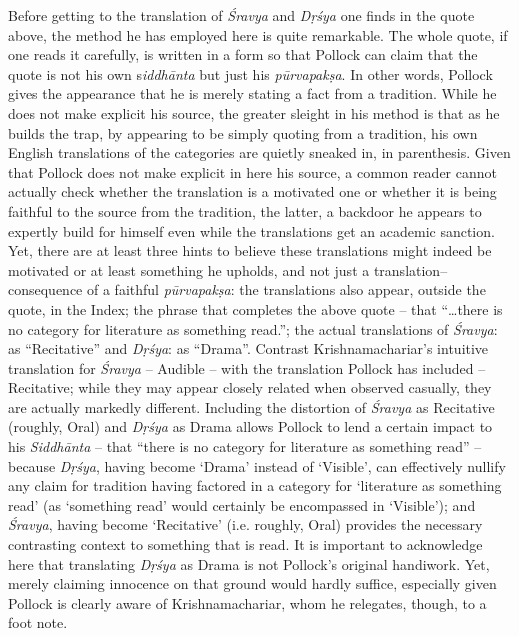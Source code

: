 Before getting to the translation of \textit{Śravya} and \textit{Dṛśya} one finds in the quote above, the method he has employed here is quite remarkable. The whole quote, if one reads it carefully, is written in a form so that Pollock can claim that the quote is not his own s\textit{iddhānta} but just his \textit{pūrvapakṣa}. In other words, Pollock gives the appearance that he is merely stating a fact from a tradition. While he does not make explicit his source, the greater sleight in his method is that as he builds the trap, by appearing to be simply quoting from a tradition, his own English translations of the categories are quietly sneaked in, in parenthesis. Given that Pollock does not make explicit in here his source, a common reader cannot actually check whether the translation is a motivated one or whether it is being faithful to the source from the tradition, the latter, a backdoor he appears to expertly build for himself even while the translations get an academic sanction. Yet, there are at least three hints to believe these translations might indeed be motivated or at least something he upholds, and not just a translation–consequence of a faithful \textit{pūrvapakṣa}: the translations also appear, outside the quote, in the Index; the phrase that completes the above quote – that “…there is no category for literature as something read.”; the actual translations of \textit{Śravya}: as “Recitative” and \textit{Dṛśya}: as “Drama”. Contrast Krishnamachariar’s intuitive translation for \textit{Śravya} – Audible – with the translation Pollock has included – Recitative; while they may appear closely related when observed casually, they are actually markedly different. Including the distortion of \textit{Śravya} as Recitative (roughly, Oral) and \textit{Dṛśya} as Drama allows Pollock to lend a certain impact to his \textit{Siddhānta} – that “there is no category for literature as something read” – because \textit{Dṛśya}, having become ‘Drama’ instead of ‘Visible’, can effectively nullify any claim for tradition having factored in a category for ‘literature as something read’ (as ‘something read’ would certainly be encompassed in ‘Visible’); and \textit{Śravya}, having become ‘Recitative’ (i.e. roughly, Oral) provides the necessary contrasting context to something that is read. It is important to acknowledge here that translating \textit{Dṛśya} as Drama is not Pollock’s original handiwork. Yet, merely claiming innocence on that ground would hardly suffice, especially given Pollock is clearly aware of Krishnamachariar, whom he relegates, though, to a foot note.


